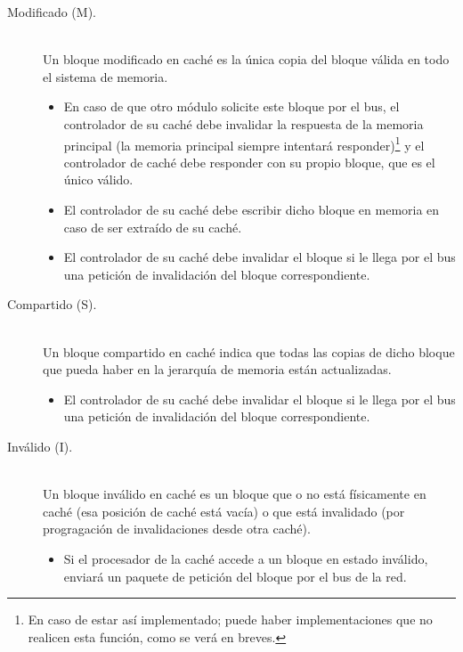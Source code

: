 \begin{description}
    \item [Modificado (M).]~\\
        Un bloque modificado en caché es la única copia del bloque válida en todo el sistema de memoria. 
        \begin{itemize}
            \item En caso de que otro módulo solicite este bloque por el bus, el controlador de su caché debe invalidar la respuesta de la memoria principal (la memoria principal siempre intentará responder)\footnote{En caso de estar así implementado; puede haber implementaciones que no realicen esta función, como se verá en breves.} y el controlador de caché debe responder con su propio bloque, que es el único válido.
            \item El controlador de su caché debe escribir dicho bloque en memoria en caso de ser extraído de su caché.
            \item El controlador de su caché debe invalidar el bloque si le llega por el bus una petición de invalidación del bloque correspondiente.
        \end{itemize}

    \item [Compartido (S).]~\\
        Un bloque compartido en caché indica que todas las copias de dicho bloque que pueda haber en la jerarquía de memoria están actualizadas.

        \begin{itemize}
            \item El controlador de su caché debe invalidar el bloque si le llega por el bus una petición de invalidación del bloque correspondiente.
        \end{itemize}

    \item [Inválido (I).]~\\
        Un bloque inválido en caché es un bloque que o no está físicamente en caché (esa posición de caché está vacía) o que está invalidado (por progragación de invalidaciones desde otra caché).

        \begin{itemize}
            \item Si el procesador de la caché accede a un bloque en estado inválido, enviará un paquete de petición del bloque por el bus de la red.
        \end{itemize}
\end{description}
